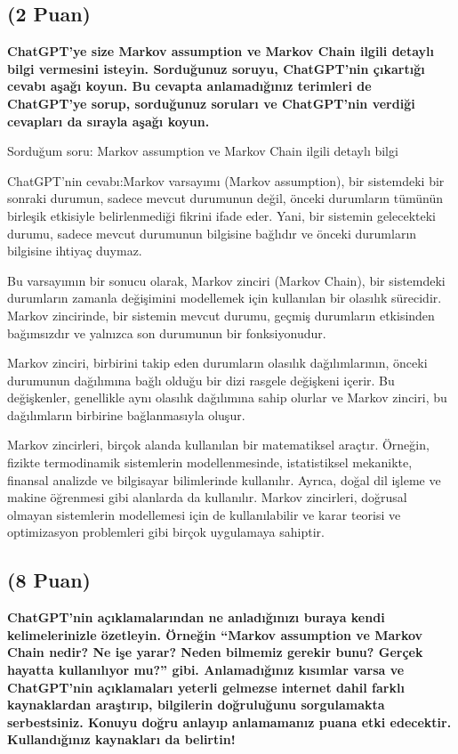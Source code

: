 \documentclass[11pt]{article}
\begin{document}
\subsection{(2 Puan)} \textbf{ChatGPT’ye size Markov assumption ve Markov Chain ilgili detaylı bilgi vermesini isteyin. Sorduğunuz soruyu, ChatGPT'nin çıkartığı cevabı aşağı koyun. Bu cevapta anlamadığınız terimleri de ChatGPT’ye sorup, sorduğunuz soruları ve ChatGPT’nin verdiği cevapları da sırayla aşağı koyun.}

\item Sorduğum soru: Markov assumption ve Markov Chain ilgili detaylı bilgi
\item ChatGPT'nin cevabı:Markov varsayımı (Markov assumption), bir sistemdeki bir sonraki durumun, sadece mevcut durumunun değil, önceki durumların tümünün birleşik etkisiyle belirlenmediği fikrini ifade eder. Yani, bir sistemin gelecekteki durumu, sadece mevcut durumunun bilgisine bağlıdır ve önceki durumların bilgisine ihtiyaç duymaz.

Bu varsayımın bir sonucu olarak, Markov zinciri (Markov Chain), bir sistemdeki durumların zamanla değişimini modellemek için kullanılan bir olasılık sürecidir. Markov zincirinde, bir sistemin mevcut durumu, geçmiş durumların etkisinden bağımsızdır ve yalnızca son durumunun bir fonksiyonudur.

Markov zinciri, birbirini takip eden durumların olasılık dağılımlarının, önceki durumunun dağılımına bağlı olduğu bir dizi rasgele değişkeni içerir. Bu değişkenler, genellikle aynı olasılık dağılımına sahip olurlar ve Markov zinciri, bu dağılımların birbirine bağlanmasıyla oluşur.

Markov zincirleri, birçok alanda kullanılan bir matematiksel araçtır. Örneğin, fizikte termodinamik sistemlerin modellenmesinde, istatistiksel mekanikte, finansal analizde ve bilgisayar bilimlerinde kullanılır. Ayrıca, doğal dil işleme ve makine öğrenmesi gibi alanlarda da kullanılır. Markov zincirleri, doğrusal olmayan sistemlerin modellemesi için de kullanılabilir ve karar teorisi ve optimizasyon problemleri gibi birçok uygulamaya sahiptir.

\subsection{(8 Puan)} \textbf{ChatGPT’nin açıklamalarından ne anladığınızı buraya kendi kelimelerinizle özetleyin. Örneğin ``Markov assumption ve Markov Chain nedir? Ne işe yarar? Neden bilmemiz gerekir bunu? Gerçek hayatta kullanılıyor mu?'' gibi. Anlamadığınız kısımlar varsa ve ChatGPT’nin açıklamaları yeterli gelmezse internet dahil farklı kaynaklardan araştırıp, bilgilerin doğruluğunu sorgulamakta serbestsiniz. Konuyu doğru anlayıp anlamamanız puana etki edecektir. Kullandığınız kaynakları da belirtin!}
\end{document}
